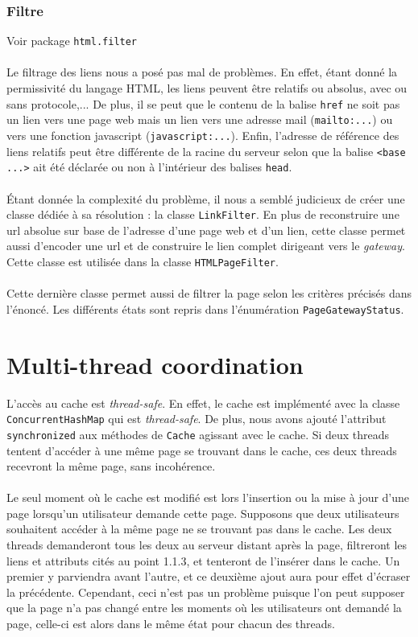 \documentclass[a4paper,11pt]{article}
\newcommand{\ttseek}[1]{Voir package \texttt{#1}\paragraph{}}
\begin{document}
\subsubsection{Filtre}
\ttseek{html.filter}
Le filtrage des liens nous a posé pas mal de problèmes. En effet, étant donné la permissivité du langage HTML, les liens peuvent être relatifs ou absolus, avec ou sans protocole,... De plus, il se peut que le contenu de la balise \texttt{href} ne soit pas un lien vers une page web mais un lien vers une adresse mail (\texttt{mailto:...}) ou vers une fonction javascript (\texttt{javascript:...}). Enfin, l'adresse de référence des liens relatifs peut être différente de la racine du serveur selon que la balise \texttt{<base ...>} ait été déclarée ou non à l'intérieur des balises \texttt{head}. 
\paragraph{}
Étant donnée la complexité du problème, il nous a semblé judicieux de créer une classe dédiée à sa résolution : la classe \texttt{LinkFilter}. En plus de reconstruire une url absolue sur base de l'adresse d'une page web et d'un lien, cette classe permet aussi d'encoder une url et de construire le lien complet dirigeant vers le \textit{gateway}. Cette classe est utilisée dans la classe \texttt{HTMLPageFilter}.
\paragraph{}
Cette dernière classe permet aussi de filtrer la page selon les critères précisés dans l'énoncé. Les différents états sont repris dans l'énumération \texttt{PageGatewayStatus}.

\section{Multi-thread coordination}
L'accès au cache est \textit{thread-safe}. En effet, le cache est implémenté avec la classe \texttt{ConcurrentHashMap} qui est \textit{thread-safe}. De plus, nous avons ajouté l'attribut \texttt{synchronized} aux méthodes de \texttt{Cache} agissant avec le cache. Si deux threads tentent d'accéder à une même page se trouvant dans le cache, ces deux threads recevront la même page, sans incohérence.
\paragraph{}
Le seul moment où le cache est modifié est lors l'insertion ou la mise à jour d'une page lorsqu'un utilisateur demande cette page. Supposons que deux utilisateurs souhaitent accéder à la même page ne se trouvant pas dans le cache. Les deux threads demanderont tous les deux au serveur distant après la page, filtreront les liens et attributs cités au point 1.1.3, et tenteront de l'insérer dans le cache. Un premier y parviendra avant l'autre, et ce deuxième ajout aura pour effet d'écraser la précédente. Cependant, ceci n'est pas un problème puisque l'on peut supposer que la page n'a pas changé entre les moments où les utilisateurs ont demandé la page, celle-ci est alors dans le même état pour chacun des threads.
\end{document}
